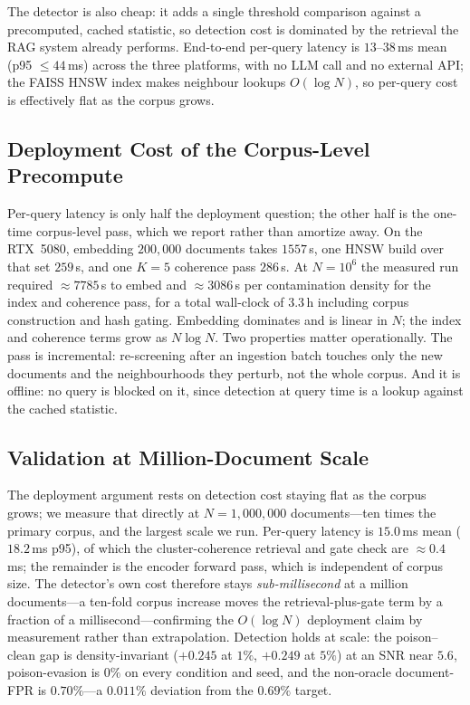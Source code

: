 \documentclass[10pt,journal,compsoc]{IEEEtran}
\begin{document}
The detector is also cheap: it adds a single threshold comparison against a precomputed, cached
statistic, so detection cost is dominated by the retrieval the RAG system already performs.
End-to-end per-query latency is $13$--$38$\,ms mean (p95 $\le 44$\,ms) across the three platforms, with no LLM call and no external API; the FAISS HNSW index makes
neighbour lookups $O(\log N)$, so per-query cost is effectively flat as the corpus grows.

\subsection{Deployment Cost of the Corpus-Level Precompute}
\label{app:cost}
Per-query latency is only half the deployment question; the other half is the one-time
corpus-level pass, which we report rather than amortize away. On the RTX~5080, embedding
$200{,}000$ documents takes $1557$\,s, one HNSW build over that set $259$\,s, and one $K=5$
coherence pass $286$\,s. At $N=10^6$ the measured run required $\approx 7785$\,s to embed and
$\approx 3086$\,s per contamination density for the index and coherence pass, for a total
wall-clock of $3.3$\,h including corpus construction and hash gating. Embedding dominates and is
linear in $N$; the index and coherence terms grow as $N\log N$. Two properties matter
operationally. The pass is incremental: re-screening after an ingestion batch touches only the
new documents and the neighbourhoods they perturb, not the whole corpus. And it is offline: no
query is blocked on it, since detection at query time is a lookup against the cached statistic.

\subsection{Validation at Million-Document Scale}
\label{subsec:scale}
The deployment argument rests on detection cost staying flat as the corpus grows; we
measure that directly at $N=1{,}000{,}000$ documents---ten times the primary corpus,
and the largest scale we run. Per-query latency is $15.0$\,ms mean ($18.2$\,ms p95),
of which the cluster-coherence retrieval and gate check are $\approx\!0.4$\,ms; the
remainder is the encoder forward pass, which is independent of corpus size. The
detector's own cost therefore stays \emph{sub-millisecond} at a million
documents---a ten-fold corpus increase moves the retrieval-plus-gate term by a
fraction of a millisecond---confirming the $O(\log N)$ deployment claim by measurement
rather than extrapolation. Detection holds at scale: the
poison--clean gap is density-invariant ($+0.245$ at $1\%$, $+0.249$ at $5\%$) at an
SNR near $5.6$, poison-evasion is $0\%$ on every condition and seed, and the
non-oracle document-FPR is $0.70\%$---a $0.011\%$ deviation from the $0.69\%$
target.
\end{document}
